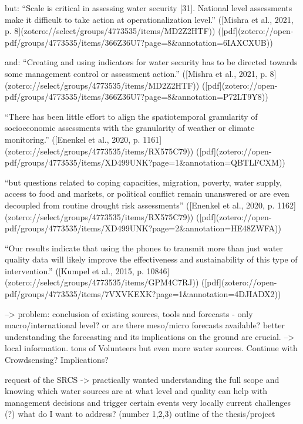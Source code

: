 but: 
“Scale is critical in assessing water security [31]. National level assessments make it difficult to take action at operationalization level.” ([Mishra et al., 2021, p. 8](zotero://select/groups/4773535/items/MD2Z2HTF)) ([pdf](zotero://open-pdf/groups/4773535/items/366Z36U7?page=8&annotation=6IAXCXUB))

and: “Creating and using indicators for water security has to be directed towards some management control or assessment action.” ([Mishra et al., 2021, p. 8](zotero://select/groups/4773535/items/MD2Z2HTF)) ([pdf](zotero://open-pdf/groups/4773535/items/366Z36U7?page=8&annotation=P72LT9Y8))

“There has been little effort to align the spatiotemporal granularity of socioeconomic assessments with the granularity of weather or climate monitoring.” ([Enenkel et al., 2020, p. 1161](zotero://select/groups/4773535/items/RX575C79)) ([pdf](zotero://open-pdf/groups/4773535/items/XD499UNK?page=1&annotation=QBTLFCXM))

“but questions related to coping capacities, migration, poverty, water supply, access to food and markets, or political conflict remain unanswered or are even decoupled from routine drought risk assessments” ([Enenkel et al., 2020, p. 1162](zotero://select/groups/4773535/items/RX575C79)) ([pdf](zotero://open-pdf/groups/4773535/items/XD499UNK?page=2&annotation=HE48ZWFA))

“Our results indicate that using the phones to transmit more than just water quality data will likely improve the effectiveness and sustainability of this type of intervention.” ([Kumpel et al., 2015, p. 10846](zotero://select/groups/4773535/items/GPM4C7RJ)) ([pdf](zotero://open-pdf/groups/4773535/items/7VXVKEXK?page=1&annotation=4DJIADX2))


--> problem: conclusion of existing sources, tools and forecasts - only macro/international level? or are there meso/micro forecasts available?
better understanding the forecasting and its implications on the ground are crucial. --> local information. tons of Volunteers but even more water sources. Continue with Crowdsensing? Implications?

request of the SRCS -> practically wanted
understanding the full scope and knowing which water sources are at what level and quality can help with management decisions and trigger certain events very locally
current challenges (?) what do I want to address? (number 1,2,3)
outline of the thesis/project




